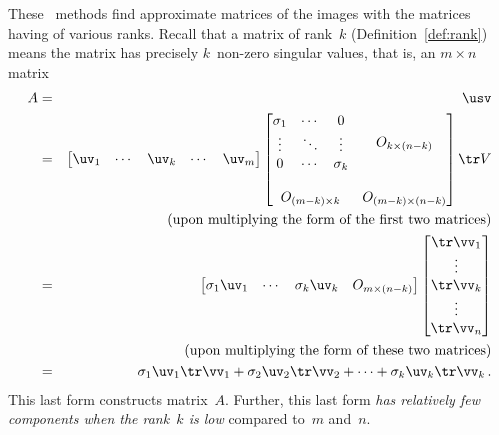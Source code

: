 These \svd\ methods find approximate matrices of the images with the matrices having of various ranks.
Recall that a matrix of rank~\(k\) (Definition~\ref{def:rank}) means the matrix has precisely \(k\)~non-zero singular values, that is, an \(m\times n\) matrix
\begin{eqnarray*}
A&=&\usv
\\&=&
\begin{bmatrix} \uv_1&\cdots&\uv_k&\cdots&\uv_m \end{bmatrix}
\begin{bmatrix} \begin{matrix} \sigma_1&\cdots&0\\
\vdots&\ddots&\vdots\\
0&\cdots&\sigma_k \end{matrix} & 
O_{k\times (n-k)}\\\,\\
O_{(m-k)\times k}&O_{(m-k)\times (n-k)}\end{bmatrix}
\tr V
\\&&(\text{upon multiplying the form of the first two matrices})
\\&=&
\begin{bmatrix} \sigma_1\uv_1&\cdots&\sigma_k\uv_k&O_{m\times(n-k)} \end{bmatrix}
\begin{bmatrix} \tr\vv_1\\\vdots\\\tr\vv_k\\\vdots\\\tr\vv_n \end{bmatrix}
\\&&(\text{upon multiplying the form of these two matrices})
\\&=&
\sigma_1\uv_1\tr\vv_1+\sigma_2\uv_2\tr\vv_2+\cdots+\sigma_k\uv_k\tr\vv_k\,.
\end{eqnarray*}
This last form constructs matrix~\(A\).
Further, this last form \emph{has relatively few components when the rank~\(k\) is low} compared to~\(m\) and~\(n\).




